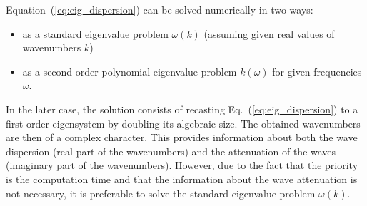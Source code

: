 \documentclass[preprint,12pt]{elsarticle}
\begin{document}
	Equation~(\ref{eq:eig_dispersion}) can be solved numerically in two ways:
	\begin{itemize}
		\item as a standard eigenvalue problem \(\omega (k)\) (assuming given real values 
		of wavenumbers \(k\))
		\item as a second-order polynomial eigenvalue problem \(k(\omega)\) for given 
		frequencies \(\omega\).
	\end{itemize}
In the later case, the solution consists of recasting Eq.~(\ref{eq:eig_dispersion}) to a 
first-order eigensystem by doubling its algebraic size.  The obtained wavenumbers are 
then of a complex character. This provides information about both the wave dispersion 
(real part of the wavenumbers) and the attenuation of the waves (imaginary part of the 
wavenumbers).  However, due to the fact that the priority is the computation time and 
that the information about the wave attenuation is not necessary, it is preferable to 
solve the standard eigenvalue problem \(\omega (k)\).
\end{document}
